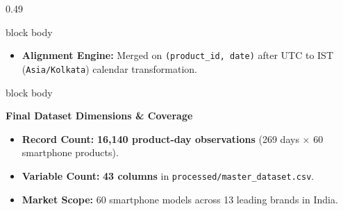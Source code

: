 \documentclass[aspectratio=169, 10pt]{beamer}
\newenvironment{card}[1][]{%
        \begin{beamercolorbox}[rounded=true,shadow=false,wd=\linewidth,sep=3.5pt,#1]{block body}%
        \fontsize{7.8pt}{9.8pt}\selectfont%
    }{%
        \end{beamercolorbox}%
    }
\begin{document}
\begin{frame}[t]
\begin{columns}[T]
\begin{column}{0.49\textwidth}
\begin{card}
\begin{itemize}
                        \item \textbf{Alignment Engine:} Merged on \texttt{(product\_id, date)} after UTC to IST (\texttt{Asia/Kolkata}) calendar transformation.                                      
                    \end{itemize}                                                                                                                                                                      
                \end{card}                                                                                                                                                                             
                \vspace{0.14cm}                                                                                                                                                                        
                \begin{card}                                                                                                                                                                           
                    \textbf{\color{BlueAccent}Final Dataset Dimensions \& Coverage}\\[0.03cm]                                                                                                          
                    \begin{itemize}\setlength{\itemsep}{1.2pt}                                                                                                                                         
                        \item \textbf{Record Count:} \textbf{16,140 product-day observations} (269 days $\times$ 60 smartphone products).                                                 
                        \item \textbf{Variable Count:} \textbf{43 columns} in \texttt{processed/master\_dataset.csv}.                                           
                        \item \textbf{Market Scope:} 60 smartphone models across 13 leading brands in India.                                                                                           
                    \end{itemize}                                                                                                                                                                      
                \end{card}                                                                                                                                                                             

\end{column}
\end{columns}
\end{frame}
\end{document}
